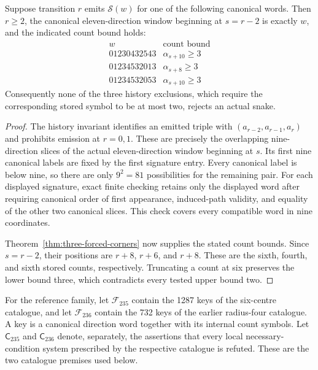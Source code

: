 \begin{proposition}\label{prop:history-exclusion-retention}
Suppose transition $r$ emits $\mathcal S(w)$ for one of the following
canonical words. Then $r\ge2$, the canonical eleven-direction window
beginning at $s=r-2$ is exactly $w$, and the indicated count bound holds:
\[
\begin{array}{c|c}
w&\text{count bound}\\\hline
01230432543&\alpha_{s+10}\ge3\\
01234532013&\alpha_{s+8}\ge3\\
01234532053&\alpha_{s+10}\ge3
\end{array}
\]
Consequently none of the three history exclusions, which require the
corresponding stored symbol to be at most two, rejects an actual snake.
\end{proposition}
\begin{proof}
The history invariant identifies an emitted triple with
$(a_{r-2},a_{r-1},a_r)$ and prohibits emission at $r=0,1$. These are precisely
the overlapping nine-direction slices of the actual eleven-direction
window beginning at $s$. Its first nine canonical labels are fixed by the
first signature entry. Every canonical label is below nine, so there are
only $9^2=81$ possibilities for the remaining pair. For each displayed
signature, exact finite checking retains only the displayed word after
requiring canonical order of first appearance, induced-path validity,
and equality of the other two canonical slices. This check covers every
compatible word in nine coordinates.

Theorem~\ref{thm:three-forced-corners} now supplies the stated count bounds.
Since $s=r-2$, their positions are $r+8$, $r+6$, and $r+8$. These are the
sixth, fourth, and sixth stored counts, respectively. Truncating a count
at six preserves the lower bound three, which contradicts every tested
upper bound two.
\end{proof}

For the reference family, let $\mathcal F_{235}$ contain the 1287 keys of
the six-centre catalogue, and let $\mathcal F_{236}$ contain the 732 keys
of the earlier radius-four catalogue. A key is a canonical direction word
together with its internal count symbols. Let $\mathsf C_{235}$ and
$\mathsf C_{236}$ denote, separately, the assertions that every local
necessary-condition system prescribed by the respective catalogue is
refuted. These are the two catalogue premises used below.

